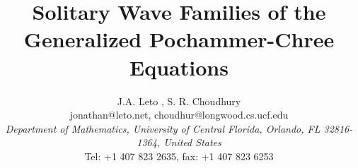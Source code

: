 \documentclass{article}
\numberwithin{equation}{section}
\begin{document}
\author{ J.A. Leto , S. R. Choudhury \\
\small{jonathan@leto.net, choudhur@longwood.cs.ucf.edu} \\
\emph{\small{Department of Mathematics, University of Central Florida, Orlando, FL 32816-1364, United States}}\\
\small{Tel: +1 407 823 2635, fax: +1 407 823 6253 } }

\title{Solitary Wave Families of the \\ Generalized Pochammer-Chree Equations}
\date{}
\maketitle










\end{document}
